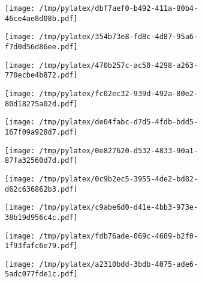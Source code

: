 \documentclass{article}
\begin{document}
\begin{figure}[htbp]
\begin{subfigure}[b]{.3\linewidth}
\texttt{[image: /tmp/pylatex/dbf7aef0-b492-411a-80b4-46ce4ae8d08b.pdf]}
\end{subfigure}
\begin{subfigure}[b]{.3\linewidth}
\texttt{[image: /tmp/pylatex/354b73e8-fd8c-4d87-95a6-f7d0d56d86ee.pdf]}
\end{subfigure}
\begin{subfigure}[b]{.3\linewidth}
\texttt{[image: /tmp/pylatex/470b257c-ac50-4298-a263-770ecbe4b872.pdf]}
\end{subfigure}
\begin{subfigure}[b]{.3\linewidth}
\texttt{[image: /tmp/pylatex/fc02ec32-939d-492a-80e2-80d18275a02d.pdf]}
\end{subfigure}
\begin{subfigure}[b]{.3\linewidth}
\texttt{[image: /tmp/pylatex/de04fabc-d7d5-4fdb-bdd5-167f09a928d7.pdf]}
\end{subfigure}
\begin{subfigure}[b]{.3\linewidth}
\texttt{[image: /tmp/pylatex/0e827620-d532-4833-90a1-87fa32560d7d.pdf]}
\end{subfigure}
\begin{subfigure}[b]{.3\linewidth}
\texttt{[image: /tmp/pylatex/0c9b2ec5-3955-4de2-bd82-d62c636862b3.pdf]}
\end{subfigure}
\begin{subfigure}[b]{.3\linewidth}
\texttt{[image: /tmp/pylatex/c9abe6d0-d41e-4bb3-973e-38b19d956c4c.pdf]}
\end{subfigure}
\begin{subfigure}[b]{.3\linewidth}
\texttt{[image: /tmp/pylatex/fdb76ade-069c-4609-b2f0-1f93fafc6e79.pdf]}
\end{subfigure}
\begin{subfigure}[b]{.3\linewidth}
\texttt{[image: /tmp/pylatex/a2310bdd-3bdb-4075-ade6-5adc077fde1c.pdf]}
\end{subfigure}
\end{figure}
\end{document}
